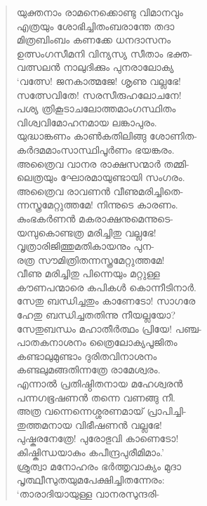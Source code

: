 \begin{verse}
യുക്തനാം രാമനെക്കൊണ്ടു വിമാനവും\\
എത്രയും ശോഭിച്ചിതംബരാന്തേ തദാ\\
മിത്രബിംബം കണക്കേ ധനദാസനം\\
ഉത്സംഗസീമനി വിന്യസ്യ സീതാം ഭക്ത-\\
വത്സലന്‍ നാലുദിക്കും പുനരാലോക്യ\\
‘വത്സേ! ജനകാത്മജേ! ശൃണു വല്ലഭേ!\\
സത്സേവിതേ! സരസീരുഹലോചനേ!\\
പശ്യ ത്രികൂടാചലോത്തമാംഗസ്ഥിതം\\
വിശ്വവിമോഹനമായ ലങ്കാപുരം.\\
യുദ്ധാങ്കണം കാണ്‍കതിലിങ്ങു ശോണിത-\\
കര്‍ദമമാംസാസ്ഥിപൂര്‍ണം ഭയങ്കരം.\\
അത്രൈവ വാനര രാക്ഷസന്മാര്‍ തമ്മി-\\
ലെത്രയും ഘോരമായുണ്ടായി സംഗരം.\\
അത്രൈവ രാവണന്‍ വീണുമരിച്ചിതെ-\\
ന്നസ്ത്രമേറ്റുത്തമേ! നിന്നുടെ കാരണം.\\
കുംഭകര്‍ണന്‍ മകരാക്ഷനുമെന്നുടെ-\\
യമ്പുകൊണ്ടത്ര മരിച്ചിതു വല്ലഭേ!\\
വൃത്രാരിജിത്തുമതികായനും പുന-\\
രത്ര സൗമിത്രിതന്നസ്ത്രമേറ്റുത്തമേ!\\
വീണു മരിച്ചിതു പിന്നെയും മറ്റുള്ള\\
കൗണപന്മാരെ കപികള്‍ കൊന്നീടിനാര്‍.\\
സേതു ബന്ധിച്ചതും കാണേടോ! സാഗരേ\\
ഹേതു ബന്ധിച്ചതതിന്നു നീയല്ലയോ?\\
സേതുബന്ധം മഹാതീര്‍ത്ഥം പ്രിയേ! പഞ്ച-\\
പാതകനാശനം ത്രൈലോക്യപൂജിതം\\
കണ്ടാലുമുണ്ടാം ദുരിതവിനാശനം\\
കണ്ടലുമങ്ങതിന്നത്രേ രാമേശ്വരം.\\
എന്നാല്‍ പ്രതിഷ്ഠിതനായ മഹേശ്വരന്‍\\
പന്നഗഭൂഷണന്‍ തന്നെ വണങ്ങു നീ.\\
അത്ര വന്നെന്നെശ്ശരണമായ് പ്രാപിച്ചി-\\
തുത്തമനായ വിഭീഷണന്‍ വല്ലഭേ!\\
പുഷ്കരനേത്രേ! പുരോഭുവി കാണെടോ!\\
കിഷ്കിന്ധയാകും കപീന്ദ്രപുരീമിമാം.’\\
ശ്രുത്വാ മനോഹരം ഭര്‍ത്തൃവാക്യം മുദാ\\
പൃത്ഥ്വീസുതയുമപേക്ഷിച്ചിതന്നേരം:\\
‘താരാദിയായുള്ള വാനരസുന്ദരി-\\

\end{verse}
